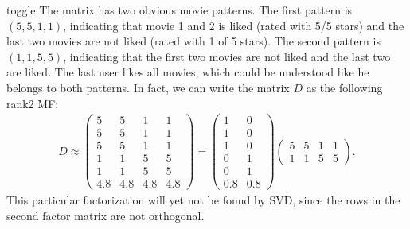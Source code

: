 \documentclass[letterpaper,10pt,english]{jupyterBook}
\begin{document}
\begin{enumerate}
\begin{sphinxuseclass}{toggle}
\sphinxAtStartPar
The matrix has two obvious movie patterns. The first pattern is \((5,5,1,1)\), indicating that movie 1 and 2 is liked (rated with 5/5 stars) and the last two movies are not liked (rated with 1 of 5 stars). The second pattern is \((1,1,5,5)\),  indicating that the first two movies are not liked  and the last two are liked. The last user likes all movies, which could be understood like he belongs to  both patterns. In fact, we can write the matrix \(D\) as the following rank\sphinxhyphen{}2 MF:
\label{equation:dim_reduction_exercises:9c40ffee-bee4-4bf4-bd2c-133498fd448e}\begin{align}
D\approx\begin{pmatrix}
    5 & 5 & 1 & 1\\
5 & 5 & 1 & 1\\
5 & 5 & 1 & 1\\
1 & 1 & 5 & 5\\
1 & 1 & 5 & 5\\
4.8 & 4.8 & 4.8 & 4.8
\end{pmatrix} = 
\begin{pmatrix}
    1 & 0\\
1 & 0\\
1 & 0\\
0 & 1 \\
0 & 1 \\
0.8 & 0.8
\end{pmatrix} 
\begin{pmatrix}
    5 & 5 & 1 & 1\\
1 & 1 & 5 & 5
\end{pmatrix}. \label{eq:patternDecomp}
\end{align}
\sphinxAtStartPar
This particular factorization will yet not be found by SVD, since the rows in the second factor matrix are  not  orthogonal.


\end{sphinxuseclass}
\end{enumerate}
\end{document}
